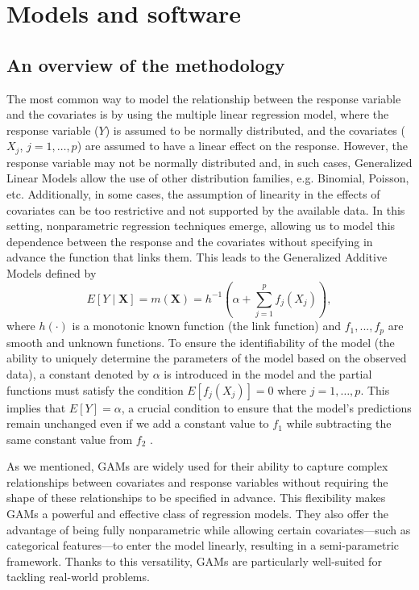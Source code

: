 \section{Models and software} \label{sec:models}

\subsection{An overview of the methodology}

The most common way to model the relationship between the response variable and the covariates is by using the multiple linear regression model, where the response variable ($Y$) is assumed to be normally distributed, and the covariates ($X_j$, $j =1, \ldots, p$) are assumed to have a linear effect on the response. However, the response variable may not be normally distributed and, in such cases, Generalized Linear Models \citep{nelder1972generalized} allow the use of other distribution families, e.g. Binomial, Poisson, etc. Additionally, in some cases, the assumption of linearity in the effects of covariates can be too restrictive and not supported by the available data. In this setting, nonparametric regression techniques emerge, allowing us to model this dependence between the response and the covariates without specifying in advance the function that links them. This leads to the Generalized Additive Models \citep{hastie1990tibshirani} defined by
%
\begin{equation}
   E[Y\mid \textbf{X}] = m(\textbf{X}) = h^{-1}(\alpha + \sum_{j=1}^p f_j(X_j)),
\label{GAM}
\end{equation}
%
\noindent where $h(\cdot)$ is a monotonic known function (the link function) and $f_1, ..., f_p$ are smooth and unknown functions. To ensure the identifiability of the model (the ability to uniquely determine the parameters of the model based on the observed data), a constant denoted by $\alpha$ is introduced in the model and the partial functions must satisfy the condition $E[f_j(X_j)] = 0$ where $j = 1, \dots, p$. This implies that $E[Y] = \alpha$, a crucial condition to ensure that the model's predictions remain unchanged even if we add a constant value to $f_1$ while subtracting the same constant value from $f_2$ \citep{hastie1990tibshirani}.

As we mentioned, GAMs are widely used for their ability to capture complex relationships between covariates and response variables without requiring the shape of these relationships to be specified in advance. This flexibility makes GAMs a powerful and effective class of regression models. They also offer the advantage of being fully nonparametric while allowing certain covariates—such as categorical features—to enter the model linearly, resulting in a semi-parametric framework. Thanks to this versatility, GAMs are particularly well-suited for tackling real-world problems.

